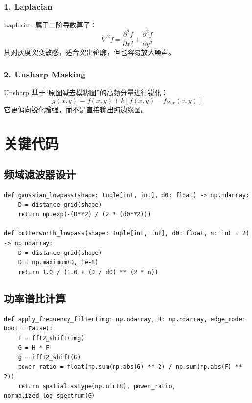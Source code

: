 \documentclass[UTF8,a4paper,12pt]{ctexart}
\begin{document}
\subsubsection*{1. Laplacian}
Laplacian 属于二阶导数算子：
\begin{equation}
\nabla^2 f=\frac{\partial^2 f}{\partial x^2}+\frac{\partial^2 f}{\partial y^2}
\end{equation}
其对灰度突变敏感，适合突出轮廓，但也容易放大噪声。

\subsubsection*{2. Unsharp Masking}
Unsharp 基于“原图减去模糊图”的高频分量进行锐化：
\begin{equation}
g(x,y)=f(x,y)+k\left[f(x,y)-f_{blur}(x,y)\right]
\end{equation}
它更偏向锐化增强，而不是直接输出纯边缘图。

\section{关键代码}
\subsection{频域滤波器设计}
\begin{lstlisting}[style=py]
def gaussian_lowpass(shape: tuple[int, int], d0: float) -> np.ndarray:
    D = distance_grid(shape)
    return np.exp(-(D**2) / (2 * (d0**2)))

def butterworth_lowpass(shape: tuple[int, int], d0: float, n: int = 2) -> np.ndarray:
    D = distance_grid(shape)
    D = np.maximum(D, 1e-8)
    return 1.0 / (1.0 + (D / d0) ** (2 * n))
\end{lstlisting}

\subsection{功率谱比计算}
\begin{lstlisting}[style=py]
def apply_frequency_filter(img: np.ndarray, H: np.ndarray, edge_mode: bool = False):
    F = fft2_shift(img)
    G = H * F
    g = ifft2_shift(G)
    power_ratio = float(np.sum(np.abs(G) ** 2) / np.sum(np.abs(F) ** 2))
    return spatial.astype(np.uint8), power_ratio, normalized_log_spectrum(G)
\end{lstlisting}
\end{document}
